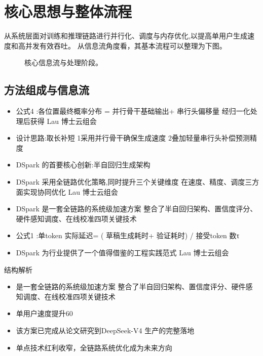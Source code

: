 \documentclass[UTF8,11pt,a4paper]{ctexart}
\begin{document}
\section{核心思想与整体流程}
从系统层面对训练和推理链路进行并行化、调度与内存优化,以提高单用户生成速度和高并发有效吞吐。 从信息流角度看，其基本流程可以整理为下图。

\begin{figure}[H]
\centering
{}
\caption{核心信息流与处理阶段。}
\end{figure}

\subsection{方法组成与信息流}
\begin{itemize}
\item 公式4 :各位置最终概率分布 = 并行骨干基础输出+ 串行头偏移量 经归一化处理后获得 Lau 博士云组会
\item 设计思路:取长补短 1采用并行骨干确保生成速度 2叠加轻量串行头补偿预测精度
\item DSpark 的首要核心创新:半自回归生成架构
\item DSpark 采用全链路优化策略,同时提升三个关键维度 在速度、精度、调度三方面实现协同优化 Lau 博士云组会
\item DSpark 是一套全链路的系统级加速方案 整合了半自回归架构、置信度评分、硬件感知调度、在线校准四项关键技术
\item 公式1 :单token 实际延迟= ( 草稿生成耗时+ 验证耗时) / 接受token 数τ
\item DSpark 为行业提供了一个值得借鉴的工程实践范式 Lau 博士云组会
\end{itemize}

\begin{keybox}{结构解析}
\begin{itemize}
\item 是一套全链路的系统级加速方案 整合了半自回归架构、置信度评分、硬件感知调度、在线校准四项关键技术
\item 单用户速度提升60\\%
\item 该方案已完成从论文研究到DeepSeek-V4 生产的完整落地
\item 单点技术红利收窄，全链路系统优化成为未来方向
\end{itemize}
\end{keybox}
\end{document}
